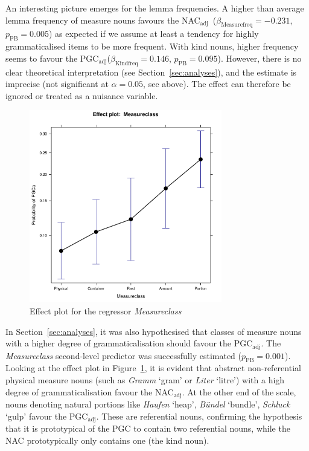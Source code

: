 \documentclass[USenglish]{article}
\newcommand{\Sub}[1]{\ensuremath{\mathrm{_{#1}}}}
\newcommand{\mpPB}{\ensuremath{p_{\text{PB}}}}
\newcommand{\NACa}{NAC\Sub{adj}}
\newcommand{\PGCa}{PGC\Sub{adj}}
\begin{document}
An interesting picture emerges for the lemma frequencies.
A higher than average lemma frequency of measure nouns favours the \NACa\ ($\beta_{\text{Measurefreq}}=-0.231$, $\mpPB=0.005$) as expected if we assume at least a tendency for highly grammaticalised items to be more frequent.
With kind nouns, higher frequency seems to favour the \PGCa ($\beta_{\text{Kindfreq}}=0.146$, $\mpPB=0.095$).
However, there is no clear theoretical interpretation (see Section~\ref{sec:analyses}), and the estimate is imprecise (not significant at $\alpha=0.05$, see above).
The effect can therefore be ignored or treated as a nuisance variable.



\begin{figure}[h!]
  \centering
  \includegraphics[width=0.75\textwidth]{../R/output/corpus_Measureclass}
  \caption{Effect plot for the regressor \textit{Measureclass}}
  \label{fig:eff:measureattraction}
\end{figure}

In Section~\ref{sec:analyses}, it was also hypothesised that classes of measure nouns with a higher degree of grammaticalisation should favour the \PGCa.
The \textit{Measureclass} second-level predictor was successfully estimated ($\mpPB=0.001$).
Looking at the effect plot in Figure~\ref{fig:eff:measureattraction}, it is evident that abstract non-referential physical measure nouns (such as \textit{Gramm} `gram' or \textit{Liter} `litre') with a high degree of grammaticalisation favour the \NACa.
At the other end of the scale, nouns denoting natural portions like \textit{Haufen} `heap', \textit{Bündel} `bundle', \textit{Schluck} `gulp' favour the \PGCa.
These are referential nouns, confirming the hypothesis that it is prototypical of the PGC to contain two referential nouns, while the NAC prototypically only contains one (the kind noun).
\end{document}
